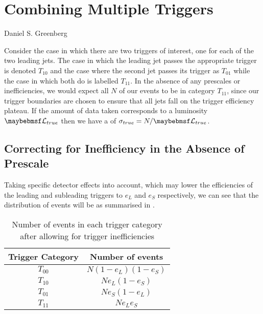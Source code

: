 \chapter{Combining Multiple Triggers}
\label{chap:appendix:trigger_efficiencies}

{Daniel S. Greenberg}

Consider the case in which there are two triggers of interest, one for each of the two leading jets.
The case in which the leading jet passes the appropriate trigger is denoted $T_{10}$ and the case where the second jet passes its trigger as $T_{01}$ while the case in which both do is labelled $T_{11}$.
In the absence of any prescales or inefficiencies, we would expect all $N$ of our events to be in category $T_{11}$, since our trigger boundaries are chosen to ensure that all jets fall on the trigger efficiency plateau.
If the amount of data taken corresponds to a luminosity $\luminosity_{true}$ then we have a \xs of $\sigma_{true} = N / \luminosity_{true}$.

\section{Correcting for Inefficiency in the Absence of Prescale}
Taking specific detector effects into account, which may lower the efficiencies of the leading and subleading triggers to $e_L$ and $e_S$ respectively, we can see that the distribution of events will be as summarised in .

\begin{table}
\begin{center}
  \begin{tabular}{ c c }
    Trigger Category & Number of events  \\
    \midrule
    $T_{00}$         & $N(1-e_L)(1-e_S)$ \\
    $T_{10}$         & $N e_L (1-e_S)$   \\ 
    $T_{01}$         & $N e_S (1-e_L)$   \\
    $T_{11}$         & $N e_L e_S$       \\       
  \end{tabular}
  \caption{Number of events in each trigger category after allowing for trigger
           inefficiencies}
  \label{tab:appendix:trig_inefficiencies}
\end{center}
\end{table}

